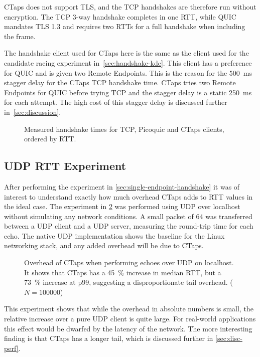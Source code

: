 CTaps does not support TLS, and the
TCP handshakes are therefore run without encryption.
The TCP 3-way handshake completes in one RTT, while 
QUIC mandates TLS 1.3 and requires two RTTs for a full handshake
when including the  frame.

The handshake client used for CTaps here is the same as
the client used for the candidate racing experiment in~\cref{sec:handshake-kde}.
This client has a preference
for QUIC and is given two Remote Endpoints. This is the reason for the
\qty{500}{\milli\second} stagger delay for the CTaps TCP
handshake time. CTaps tries two Remote Endpoints for QUIC before trying TCP
and the stagger delay is a static \qty{250}{\milli\second} for each attempt.
The high cost of this stagger delay is discussed further in~\cref{sec:discussion}.

\begin{figure}[H]
    
    \caption[Handshake time experiment]{Measured handshake times for TCP, Picoquic and CTaps clients, ordered by RTT.}
    \label{fig:racing-handshake}
\end{figure}

\subsection{UDP RTT Experiment}\label{sec:udp-rtt-ex}
After performing the experiment in \cref{sec:single-endpoint-handshake} it was of
interest to understand exactly how much overhead CTaps adds to RTT values in the ideal case.
The experiment in \cref{fig:udp-overhead} was performed using UDP over localhost without
simulating any network conditions. A small packet of \qty{64}{\Bytes} was transferred
between a UDP client and a UDP server, measuring the round-trip time for each echo.
The native UDP implementation shows the baseline for the Linux networking stack,
and any added overhead will be due to CTaps.

\begin{figure}[H]
    
    \caption[UDP RTT experiment]{Overhead of CTaps when performing echoes over UDP on localhost.
        It shows that CTaps has a \qty{45}{\percent} increase in median RTT, but a \qty{73}{\percent} increase at p99,
        suggesting a disproportionate tail overhead. ($N = \num{100000}$) }
    \label{fig:udp-overhead}
\end{figure}

This experiment shows that while the overhead in absolute numbers
is small, the relative increase over a pure UDP client is quite large.
For real-world applications this effect would be dwarfed
by the latency of the network. The more interesting
finding is that CTaps has a longer tail, which is
discussed further in \cref{sec:disc-perf}.

